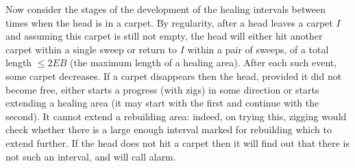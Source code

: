 \documentclass[12pt]{memoir}
\renewcommand{\le}{\leq}
\def\B{B}
\newcommand{\E}{E}
\begin{document}
\begin{Proof}
\begin{pproof}





\end{pproof} %

Now consider the stages of the development of the healing intervals between
times when the head is in a carpet.
By regularity, after a head leaves a carpet \( I \) and assuming this carpet is still not empty,
the head will either hit another carpet within a single sweep or return to \( I \) within
a pair of sweeps, of a total length \( \le 2\E\B \) (the maximum length of a healing area).
After each such event, some carpet decreases.
If a carpet disappears then the head, provided it did not become free,
either starts a progress (with zigs) in some direction
or starts extending a healing area (it may start with the first and continue with the second).
It cannot extend a rebuilding area: indeed, on trying this, zigging would check whether there is a
large enough interval marked for rebuilding which to extend further.
If the head does not hit a carpet then it will find out that there is not such an interval, and
will call alarm.


\end{Proof}
\end{document}

